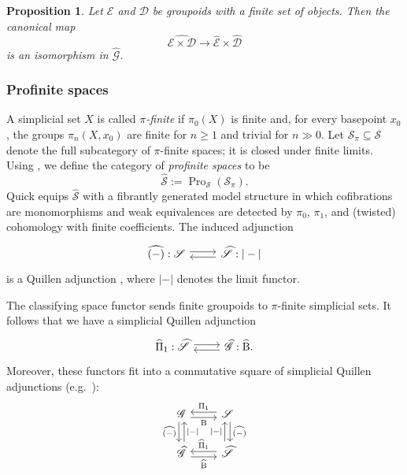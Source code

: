 \documentclass{amsart}
\newcommand{\sSet}{\mathscr{S}}
\newcommand{\Grpd}{\mathscr{G}}
\newcommand{\Pro}{\operatorname{Pro}}
\newcommand{\cs}{\mathrm{B}}
\newtheorem{prop}[theorem]{Proposition}%
\theoremstyle{definition}
\numberwithin{equation}{section}
\begin{document}
\begin{prop}\cite[Proposition~4.23]{Horel_profinite_groupoids}\label{prop: profinite completion preserves products of groupoids}
Let $\mathscr{E}$ and $\mathscr{D}$ be groupoids with a finite set of objects. Then the canonical map
\[
\widehat{\mathscr{E}\times \mathscr{D}}\longrightarrow
\widehat{\mathscr{E}}\times \widehat{\mathscr{D}}
\]
is an isomorphism in $\widehat{\Grpd}$.
\end{prop}


\subsubsection{Profinite spaces}\label{sec: profinite spaces}
A simplicial set $X$ is called \emph{$\pi$-finite} if $\pi_0(X)$ is finite and, for every basepoint
$x_0$, the groups $\pi_n(X,x_0)$ are finite for $n\ge 1$ and trivial for $n\gg 0$.
Let $\sSet_{\pi}\subseteq \sSet$ denote the full subcategory of $\pi$-finite spaces; it is closed under
finite limits. Using \cite[Theorem~5.2]{BM20}, we define the category of \emph{profinite spaces} to be
\[
\widehat{\sSet}:=\Pro_{\sSet}(\sSet_{\pi}).
\]
Quick \cite[Theorem~2.12]{Quick} equips $\widehat{\sSet}$ with a fibrantly generated model structure in
which cofibrations are monomorphisms and weak equivalences are detected by $\pi_0$, $\pi_1$, and
(twisted) cohomology with finite coefficients. The induced adjunction
\[
\begin{tikzcd}
\widehat{(-)}:\sSet \arrow[r, shift left=1] &
\arrow[l, shift left=1] \widehat{\sSet}:|-|
\end{tikzcd}
\]
is a Quillen adjunction \cite[Proposition~2.28]{Quick}, where $|-|$ denotes the limit functor.


The classifying space functor sends finite groupoids to $\pi$-finite simplicial sets. %
It follows that we have a simplicial Quillen adjunction
\[
\begin{tikzcd}
\widehat{\Pi}_1:\widehat{\sSet} \arrow[r, shift left=1] &
\arrow[l, shift left=1] \widehat{\Grpd} : \widehat{\cs}.
\end{tikzcd}
\]
Moreover, these functors fit into a commutative square of simplicial Quillen adjunctions
(e.g.\ \cite[Example~7.14]{BM20}):
\[
\begin{tikzcd}
\Grpd \arrow[d, shift right =1, "\widehat{(-)}"'] \arrow[r, shift right=1, "\cs"'] & \sSet \arrow[l, shift right=1, "\Pi_1"'] \arrow[d, shift left=1, "\widehat{(-)}"] \\
\widehat{\Grpd} \arrow[u, shift right =1, "|-|"'] \arrow[r, shift right=1, "\widehat{\cs}"'] & \widehat{\sSet} \arrow[l, shift right=1, "\widehat{\Pi}_1"'] \arrow[u, shift left=1, "|-|"]
\end{tikzcd}
\]
\end{document}
